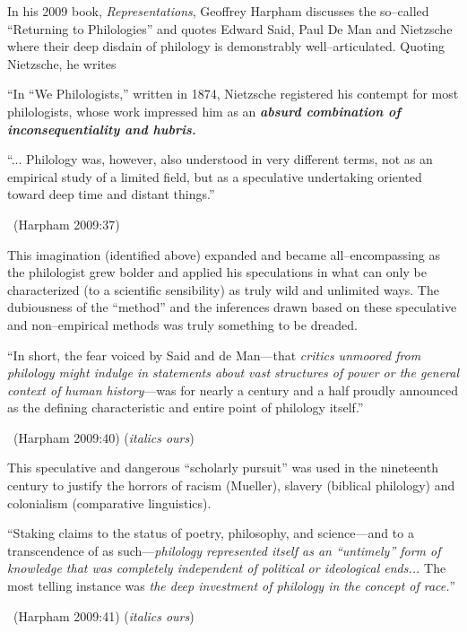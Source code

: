 In his 2009 book, \textit{Representations}, Geoffrey Harpham discusses the so–called “Returning to Philologies” and quotes Edward Said, Paul De Man and Nietzsche where their deep disdain of philology is demonstrably well–articulated. Quoting Nietzsche, he writes

“In “We Philologists,” written in 1874, Nietzsche registered his contempt for most philologists, whose work impressed him as an \textbf{\textit{absurd combination of inconsequentiality and hubris.}}

\begin{myquote}
“... Philology was, however, also understood in very different terms, not as an empirical study of a limited field, but as a speculative undertaking oriented toward deep time and distant things.” 

~\hfill (Harpham 2009:37)
\end{myquote}

This imagination (identified above) expanded and became all–encompassing as the philologist grew bolder and applied his speculations in what can only be characterized (to a scientific sensibility) as truly wild and unlimited ways. The dubiousness of the “method” and the inferences drawn based on these speculative and non–empirical methods was truly something to be dreaded.

\begin{myquote}
“In short, the fear voiced by Said and de Man—that \textit{critics unmoored from philology might indulge in statements about vast structures of power or the general context of human history}—was for nearly a century and a half proudly announced as the defining characteristic and entire point of philology itself.” 

~\hfill (Harpham 2009:40) (\textit{italics ours})
\end{myquote}

This speculative and dangerous “scholarly pursuit” was used in the nineteenth century to justify the horrors of racism (Mueller), slavery (biblical philology) and colonialism (comparative linguistics).

\begin{myquote}
“Staking claims to the status of poetry, philosophy, and science—and to a transcendence of as such—\textit{philology represented itself as an “untimely” form of knowledge that was completely independent of political or ideological ends...} The most telling instance was \textit{the deep investment of philology in the concept of race.}” 

~\hfill (Harpham 2009:41) (\textit{italics ours})
\end{myquote}


